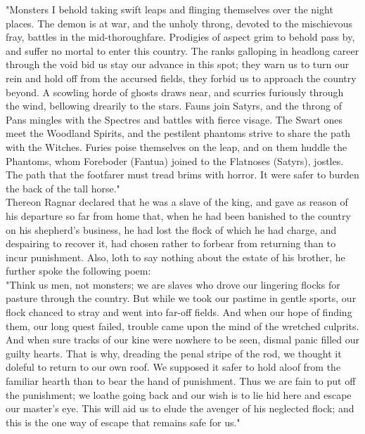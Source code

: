 \documentclass[10pt,a4paper]{report}
\begin{document}
"Monsters I behold taking swift leaps and flinging themselves over the night places. The demon is at war, and the unholy throng, devoted to the mischievous fray, battles in the mid-thoroughfare. Prodigies of aspect grim to behold pass by, and suffer no mortal to enter this country. The ranks galloping in headlong career through the void bid us stay our advance in this spot; they warn us to turn our rein and hold off from the accursed fields, they forbid us to approach the country beyond. A scowling horde of ghosts draws near, and scurries furiously through the wind, bellowing drearily to the stars. Fauns join Satyrs, and the throng of Pans mingles with the Spectres and battles with fierce visage. The Swart ones meet the Woodland Spirits, and the pestilent phantoms strive to share the path with the Witches. Furies poise themselves on the leap, and on them huddle the Phantoms, whom Foreboder (Fantua) joined to the Flatnoses (Satyrs), jostles. The path that the footfarer must tread brims with horror. It were safer to burden the back of the tall horse."\\

Thereon Ragnar declared that he was a slave of the king, and gave as reason of his departure so far from home that, when he had been banished to the country on his shepherd's business, he had lost the flock of which he had charge, and despairing to recover it, had chosen rather to forbear from returning than to incur punishment. Also, loth to say nothing about the estate of his brother, he further spoke the following poem:\\

"Think us men, not monsters; we are slaves who drove our lingering flocks for pasture through the country. But while we took our pastime in gentle sports, our flock chanced to stray and went into far-off fields. And when our hope of finding them, our long quest failed, trouble came upon the mind of the wretched culprits. And when sure tracks of our kine were nowhere to be seen, dismal panic filled our guilty hearts. That is why, dreading the penal stripe of the rod, we thought it doleful to return to our own roof. We supposed it safer to hold aloof from the familiar hearth than to bear the hand of punishment. Thus we are fain to put off the punishment; we loathe going back and our wish is to lie hid here and escape our master's eye. This will aid us to elude the avenger of his neglected flock; and this is the one way of escape that remains safe for us."\\
\end{document}

